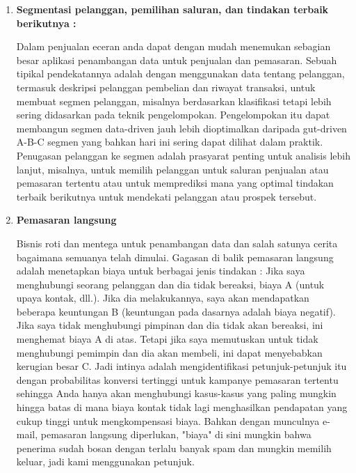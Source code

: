 \begin{enumerate}
    \item \textbf{Segmentasi pelanggan, pemilihan saluran, dan tindakan terbaik berikutnya :}
  \par Dalam penjualan eceran anda dapat dengan mudah menemukan sebagian besar aplikasi penambangan data untuk penjualan dan pemasaran. Sebuah tipikal pendekatannya adalah dengan menggunakan data tentang pelanggan, termasuk deskripsi pelanggan pembelian dan riwayat transaksi, untuk membuat segmen pelanggan, misalnya berdasarkan klasifikasi tetapi lebih sering didasarkan pada teknik pengelompokan. Pengelompokan itu dapat membangun segmen data-driven jauh lebih dioptimalkan daripada gut-driven A-B-C segmen yang bahkan hari ini sering dapat dilihat dalam praktik. Penugasan pelanggan ke segmen adalah prasyarat penting untuk analisis lebih lanjut, misalnya, untuk memilih pelanggan untuk saluran penjualan atau pemasaran tertentu atau untuk memprediksi mana yang optimal tindakan terbaik berikutnya untuk mendekati pelanggan atau prospek tersebut.
  \item	\textbf{Pemasaran langsung}
  
  \par Bisnis roti dan mentega untuk penambangan data dan salah satunya cerita bagaimana semuanya telah dimulai. Gagasan di balik pemasaran langsung adalah menetapkan biaya untuk berbagai jenis tindakan : Jika saya menghubungi seorang pelanggan dan dia tidak bereaksi, biaya  A (untuk upaya kontak, dll.). Jika dia melakukannya, saya akan mendapatkan beberapa keuntungan B (keuntungan pada dasarnya adalah biaya negatif). Jika saya tidak menghubungi pimpinan dan dia tidak akan bereaksi, ini menghemat biaya A di atas. Tetapi jika saya memutuskan untuk tidak menghubungi pemimpin dan dia akan membeli, ini dapat menyebabkan kerugian besar C. Jadi intinya adalah mengidentifikasi petunjuk-petunjuk itu dengan probabilitas konversi tertinggi untuk kampanye pemasaran tertentu sehingga Anda hanya akan menghubungi kasus-kasus yang paling mungkin hingga batas di mana biaya kontak tidak lagi menghasilkan pendapatan yang cukup tinggi untuk mengkompensasi biaya. Bahkan dengan munculnya e-mail, pemasaran langsung diperlukan, "biaya" di sini mungkin bahwa penerima sudah bosan dengan terlalu banyak spam dan mungkin memilih keluar, jadi kami menggunakan petunjuk.
  

\end{enumerate}
